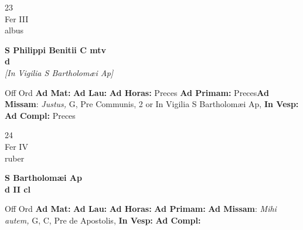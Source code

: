 \documentclass[10pt, openany]{book}
\begin{document}
    \begin{center}
        \begin{minipage}{3.5in}
            \vspace{2em}
            \begin{minipage}{0.5in}
                {\Huge 23} \\
                {\normalsize Fer III} \\
                {\normalsize albus}
            \end{minipage}
            \begin{minipage}{3.0in}
                \textbf{ \large S Philippi Benitii C mtv \\
                \textnormal{\normalsize d}} \\ \textit{[In Vigilia S Bartholomæi Ap]} \\ 
            \end{minipage}
            \begin{justify}Off Ord
                \textbf{Ad Mat: }
                \textbf{Ad Lau: }
                \textbf{Ad Horas: }Preces
                \textbf{Ad Primam: }Preces\textbf{Ad Missam}: \textit{Justus,} G, Pre Communis, 2 or In Vigilia S Bartholomæi Ap,  
                \textbf{In Vesp: }
                \textbf{Ad Compl: }Preces
            \end{justify}
        \end{minipage}
    \end{center}

    \begin{center}
        \begin{minipage}{3.5in}
            \vspace{2em}
            \begin{minipage}{0.5in}
                {\Huge 24} \\
                {\normalsize Fer IV} \\
                {\normalsize ruber}
            \end{minipage}
            \begin{minipage}{3.0in}
                \textbf{ \large S Bartholomæi Ap \\
                \textnormal{\normalsize d II cl}} \\ 
            \end{minipage}
            \begin{justify}Off Ord
                \textbf{Ad Mat: }
                \textbf{Ad Lau: }
                \textbf{Ad Horas: }
                \textbf{Ad Primam: }\textbf{Ad Missam}: \textit{Mihi autem,} G, C, Pre de Apostolis,  
                \textbf{In Vesp: }
                \textbf{Ad Compl: }
            \end{justify}
        \end{minipage}
    \end{center}
\end{document}
